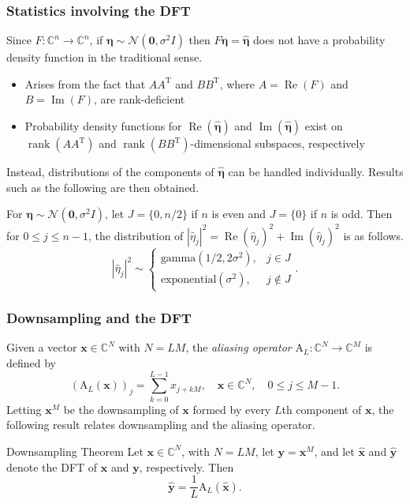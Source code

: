 \documentclass[t]{beamer}
\newcommand{\noise}{\eta}	%
\newcommand{\noiseSD}{\sigma}	%
\renewcommand{\Re}{\operatorname{Re}}	%
\renewcommand{\Im}{\operatorname{Im}}	%
\newcommand{\trans}{\mathrm{T}}	%
\DeclareMathOperator{\rank}{rank}	%
\newcommand{\noiseVec}{\mathbf{\noise}}	%
\begin{document}
\begin{frame}
\frametitle{Statistics involving the DFT}
Since $F : \mathbb{C}^n \rightarrow \mathbb{C}^n$, if $\mathbf{\noiseVec} \sim \mathcal{N}(\mathbf{0},\noiseSD^2 I)$ then $F\mathbf{\noiseVec} = \widehat{\mathbf{\noiseVec}}$ does not have a probability density function in the traditional sense.
\begin{itemize}
\item Arises from the fact that $AA^\trans$ and $BB^\trans$, where $A = \Re(F)$ and $B = \Im(F)$, are rank-deficient
\item Probability density functions for $\Re(\widehat{\mathbf{\noiseVec}})$ and $\Im(\widehat{\mathbf{\noiseVec}})$ exist on $\rank(AA^\trans)$ and $\rank(BB^\trans)$-dimensional subspaces, respectively \cite[p.~527-528]{Rao1973}
\end{itemize}
Instead, distributions of the components of $\widehat{\mathbf{\noiseVec}}$ can be handled individually. Results such as the following are then obtained.
\begin{block}{}
For $\noiseVec \sim \mathcal{N}(\mathbf{0},\noiseSD^2 I)$, let $J = \{0,n/2\}$ if $n$ is even and $J = \{0\}$ if $n$ is odd. Then for $0 \leq j \leq n-1$, the distribution of $|\widehat{\noise}_j|^2 = \Re(\widehat{\noise}_j)^2 + \Im(\widehat{\noise}_j)^2$ is as follows.
\[|\widehat{\noise}_j|^2 \sim \begin{cases}
\text{gamma}(1/2,2\noiseSD^2), & j \in J \\
\text{exponential}(\noiseSD^2), & j \not\in J \end{cases}.\]
\end{block}
\end{frame}

\begin{frame}
\frametitle{Downsampling and the DFT}
Given a vector $\mathbf{x} \in \mathbb{C}^N$ with $N = LM$, the \textit{aliasing operator} $\text{A}_L : \mathbb{C}^N \rightarrow \mathbb{C}^M$ is defined by
\[\left(\text{A}_L(\mathbf{x})\right)_j = \sum_{k=0}^{L-1} x_{j+kM}, \quad \mathbf{x} \in \mathbb{C}^N, \quad 0 \leq j \leq M-1.\]
Letting $\mathbf{x}^M$ be the downsampling of $\mathbf{x}$ formed by every $L$th component of $\mathbf{x}$, the following result relates downsampling and the aliasing operator.
\begin{block}{Downsampling Theorem \cite{AudioDFT}}
Let $\mathbf{x} \in \mathbb{C}^N$, with $N = LM$, let $\mathbf{y} = \mathbf{x}^M$, and let $\widehat{\mathbf{x}}$ and $\widehat{\mathbf{y}}$ denote the DFT of $\mathbf{x}$ and $\mathbf{y}$, respectively. Then
\[\widehat{\mathbf{y}} = \frac{1}{L} \text{A}_L(\widehat{\mathbf{x}}).\]
\end{block}
\end{frame}
\end{document}
